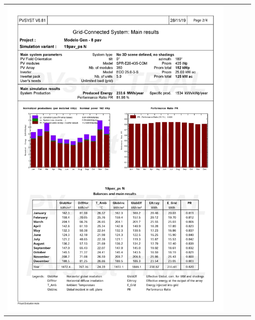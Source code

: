 \begin{table}[H]
    \centering
    \begin{tabular}{l}
        \includegraphics[width=0.9\textwidth]{figures/attachments/resultpv32.jpg}
    \end{tabular}
\end{table}
\pagebreak
